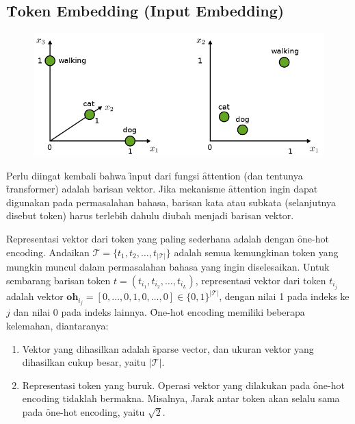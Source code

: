 	\subsection{\f{Token Embedding (Input Embedding)}}
	\label{sec:token-embedding}
	\begin{figure}[!ht]
		\centering
		\includegraphics[width=1\textwidth]{assets/pics/token-embedding.png}
		\label{fig:token-embedding}
	\end{figure}
	Perlu diingat kembali bahwa \f{input} dari fungsi \f{attention} (dan tentunya \f{transformer}) adalah barisan vektor. Jika mekanisme \f{attention} ingin dapat digunakan pada permasalahan bahasa, barisan kata atau subkata (selanjutnya disebut token) harus terlebih dahulu diubah menjadi barisan vektor.

	Representasi vektor dari token yang paling sederhana adalah dengan \f{one-hot encoding}. Andaikan $\mathcal{T} = \{t_1, t_2, \dots, t_{|\mathcal{T}|}\}$ adalah semua kemungkinan token yang mungkin muncul dalam permasalahan bahasa yang ingin diselesaikan. Untuk sembarang barisan token $t = (t_{i_1}, t_{i_2}, \dots, t_{i_L})$, representasi vektor dari token $t_{i_j}$ adalah vektor $\mathbf{oh}_{i_j} = [0, \dots, 0, 1, 0, \dots, 0] \in\{0,1\}^{|\mathcal{T}|}$, dengan nilai 1 pada indeks ke $j$ dan nilai 0 pada indeks lainnya. \f{One-hot encoding} memiliki beberapa kelemahan, diantaranya:
	\begin{enumerate}
		\item Vektor yang dihasilkan adalah \f{sparse vector}, dan ukuran vektor yang dihasilkan cukup besar, yaitu $|\mathcal{T}|$.
		\item Representasi token yang buruk. Operasi vektor yang dilakukan pada \f{one-hot encoding} tidaklah bermakna. Misalnya, Jarak antar token akan selalu sama pada \f{one-hot encoding}, yaitu $\sqrt{2}$.
	\end{enumerate}

